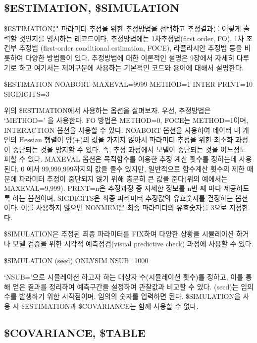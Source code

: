 \documentclass[
  10pt,
]{krantz}
\begin{document}
\hypertarget{estimation-simulation}{%
\subsection{\$ESTIMATION, \$SIMULATION}\label{estimation-simulation}}

\$ESTIMATION은 파라미터 추정을 위한 추정방법을 선택하고 추정결과를 어떻게 출력할 것인지를 명시하는 레코드이다.
추정방법에는 1차추정법(first order, FO), 1차 조건부 추정법 (first-order
conditional estimation, FOCE), 라플라시안 추정법 등을 비롯하여 다양한 방법들이 있다. 추정방법에 대한
이론적인 설명은 9장에서 자세히 다루기로 하고 여기서는 제어구문에 사용하는 기본적인 코드와 용어에 대해서 설명한다.

\$ESTIMATION NOABORT MAXEVAL=9999 METHOD=1 INTER PRINT=10 SIGDIGITS=3

위의 \$ESTIMATION에서 사용하는 옵션을 살펴보자. 우선, 추정방법은 `METHOD=' 을 사용한다. FO 방법은
METHOD=0, FOCE는 METHOD=1이며, INTERACTION 옵션을 사용할 수 있다. NOABORT 옵션을 사용하여
데이터 내 개인의 Hessian 행렬이 양(+)의 값을 가지지 않아서 파라미터 추정을 위한 최소화 과정이 중단되는 것을
방지할 수 있다. 즉, 추정 과정에서 모델이 중단되는 것을 어느정도 피할 수 있다. MAXEVAL 옵션은 목적함수를 이용한
추정 계산 횟수를 정하는데 사용된다. 0 에서 99,999,999까지의 값을 줄수 있지만, 일반적으로 함수계산 횟수의 제한 때문에
파라미터 추정이 중단되지 않기 위해 충분히 큰 값을 준다(위의 예에서는 MAXEVAL=9,999). PRINT=n은 추정과정 중
자세한 정보를 n번 째 마다 제공하도록 하는 옵션이며, SIGDIGITS은 최종 파라미터 추정값의 유효숫자를 결정하는
옵션이다. 이를 사용하지 않으면 NONMEM은 최종 파라미터의 유효숫자를 3으로 지정한다.

\$SIMULATION은 추정된 최종 파라미터를 FIX하여 다양한 상황을 시뮬레이션 하거나 모델 검증을 위한 시각적
예측점검(visual predictive check) 과정에 사용할 수 있다.

\$SIMULATION (seed) ONLYSIM NSUB=1000

`NSUB='으로 시뮬레이션 하고자 하는 대상자 수(시뮬레이션 횟수)를 정하고, 이를 통해 얻은 결과를 정리하여 예측구간을
설정하여 관찰값과 비교할 수 있다. (seed)는 임의 수를 발생하기 위한 시작점이며, 임의의 숫자를 입력하면
된다. \$SIMULATION을 사용 시 \$ESTIMATION과 \$COVARIANCE는 함께 사용할 수 없다.

\hypertarget{covariance-table}{%
\subsection{\$COVARIANCE, \$TABLE}\label{covariance-table}}
\end{document}
